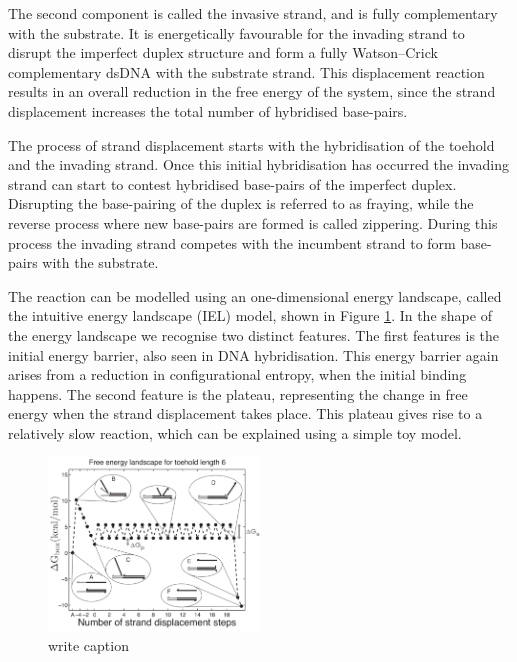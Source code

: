 The second component is called the invasive strand, and is fully complementary with the
substrate. It is energetically favourable for the invading
strand to disrupt the imperfect duplex structure and form a fully Watson–Crick
complementary dsDNA with the substrate strand. This displacement reaction results in an
overall reduction in the free energy of the system, since the strand displacement
increases the total number of hybridised base-pairs.

The process of strand displacement starts with the hybridisation of the toehold and the
invading strand. Once this initial hybridisation has occurred the invading strand can
start to contest hybridised base-pairs of the imperfect duplex. Disrupting the
base-pairing of the duplex is referred to as fraying, while the reverse process
where new base-pairs are formed is called zippering. During this process the invading
strand competes with the incumbent strand to form base-pairs with the substrate.

The reaction can be modelled using an one-dimensional energy landscape, called the
intuitive energy landscape (IEL) model\cite{Srinivas2013}, shown in Figure \ref{fig:IEL}.
In the shape of the energy landscape we recognise two distinct features. The first
features is the initial energy barrier, also seen in DNA hybridisation. This energy
barrier again arises from a reduction in configurational entropy, when the initial
binding happens. The second feature is the plateau, representing the change in free
energy when the strand displacement takes place. This plateau gives rise to a relatively
slow reaction, which can be explained using a simple toy model.\\

\begin{figure}[ht]
\begin{center}
  \includegraphics[width=0.5\textwidth]{Figures/ToeholdDiagram.png}
  \caption{write caption \cite{Srinivas2013}}
  \label{fig:IEL}
\end{center}
\end{figure}

